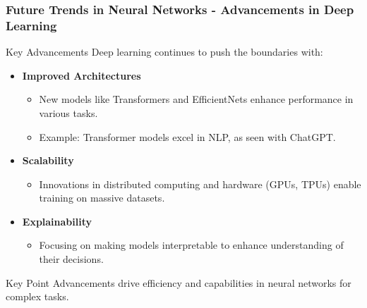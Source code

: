 \documentclass[aspectratio=169]{beamer}
\begin{document}
\begin{frame}[fragile]
    \frametitle{Future Trends in Neural Networks - Advancements in Deep Learning}
    \begin{block}{Key Advancements}
        Deep learning continues to push the boundaries with:
        \begin{itemize}
            \item \textbf{Improved Architectures}
                \begin{itemize}
                    \item New models like Transformers and EfficientNets enhance performance in various tasks.
                    \item Example: Transformer models excel in NLP, as seen with ChatGPT.
                \end{itemize}
            \item \textbf{Scalability}
                \begin{itemize}
                    \item Innovations in distributed computing and hardware (GPUs, TPUs) enable training on massive datasets.
                \end{itemize}
            \item \textbf{Explainability}
                \begin{itemize}
                    \item Focusing on making models interpretable to enhance understanding of their decisions.
                \end{itemize}
        \end{itemize}
    \end{block}
    \begin{block}{Key Point}
        Advancements drive efficiency and capabilities in neural networks for complex tasks.
    \end{block}
\end{frame}
\end{document}
